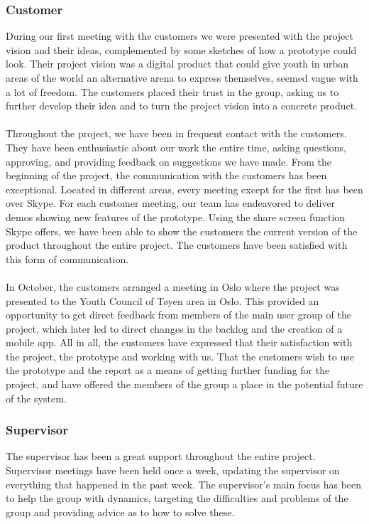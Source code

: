 \subsubsection{Customer} During our first meeting with the customers we were presented with the project vision and their ideas, complemented by some sketches of how a prototype could look. Their project vision was a digital product that could give youth in urban areas of the world an alternative arena to express themselves, seemed vague with a lot of freedom. The customers placed their trust in the group, asking us to further develop their idea and to turn the project vision into a concrete product. 
\paragraph{} Throughout the project, we have been in frequent contact with the customers. They have been enthusiastic about our work the entire time, asking questions, approving, and providing feedback on suggestions we have made. From the beginning of the project, the communication with the customers has been exceptional. Located in different areas, every meeting except for the first has been over Skype. For each customer meeting, our team has endeavored to deliver demos showing new features of the prototype. Using the share screen function Skype offers, we have been able to show the customers the current version of the product throughout the entire project. The customers have been satisfied with this form of communication. 
\paragraph{} In October, the customers arranged a meeting in Oslo where the project was presented to the Youth Council of T{\o}yen area in Oslo. This provided an opportunity to get direct feedback from members of the main user group of the project, which later led to direct changes in the backlog and the creation of a mobile app. All in all, the customers have expressed that their satisfaction with the project, the prototype and working with us. That the customers wish to use the prototype and the report as a means of getting further funding for the project, and have offered the members of the group a place in the potential future of the system.
\subsubsection{Supervisor} The supervisor has been a great support throughout the entire project. Supervisor meetings have been held once a week, updating the supervisor on everything that happened in the past week. The supervisor's main focus has been to help the group with dynamics, targeting the difficulties and problems of the group and providing advice as to how to solve these. 

